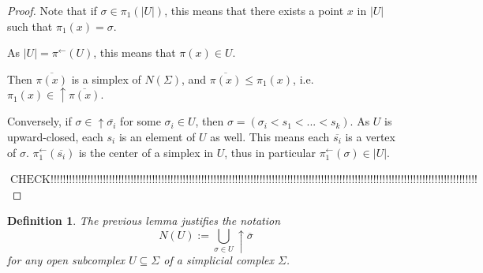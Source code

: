 \documentclass[12pt]{article}
\DeclareMathOperator{\note}{CHECK!!!!!!!!!!!!!!!!!!!!!!!!!!!!!!!!!!!!!!!!!!!!!!!!!!!!!!!!!!!!!!!!!!!!!!!!!!!!!!!!!!!!!!!!!!!!!!!!!!!!!!!!!!!!!!!!!!!!!!!!!!!!!!!!!!!!!!!!!!!}
\newtheorem{definition}[theorem]{Definition}
\numberwithin{equation}{subsection}
\begin{document}
\begin{proof}
	Note that if $\sigma\in \pi_1(|U|)$, this means that there exists a point $x$ in $|U|$ such that $\pi_1(x)=\sigma$.
	
	As $|U|=\pi^{\gets}(U)$, this means that $\pi(x)\in U$.
	
	Then $\overline{\pi(x)}$ is a simplex of $N(\Sigma)$, and $\overline{\pi(x)}\leq \pi_1(x)$, i.e. $\pi_1(x)\in \uparrow{\overline{\pi(x)}}$.
	
	Conversely, if $\sigma\in \uparrow\overline{\sigma_i}$ for some $\sigma_i\in U$, then $\sigma=(\sigma_i<s_1<...<s_k)$.
	As $U$ is upward-closed, each $s_i$ is an element of $U$ as well.
	This means each $\overline{s_i}$ is a vertex of $\sigma$. 
	$\pi_1^{\gets}(\overline{s_i})$ is the center of a simplex in $U$, thus in particular $\pi_1^\gets(\sigma)\in |U|$.
	
$\note$
\end{proof}

\begin{definition}
	The previous lemma justifies the notation \[N(U):=\bigcup_{\sigma\in U}\uparrow\overline\sigma\] for any open subcomplex $U\subseteq\Sigma$ of a simplicial complex $\Sigma$.
\end{definition}
\end{document}
